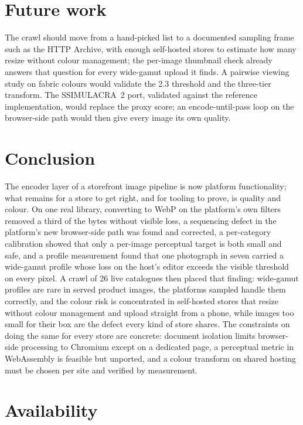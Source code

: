 \documentclass[sigconf,nonacm,screen]{acmart}
\begin{document}
\section{Future work}

The crawl should move from a hand-picked list to a documented sampling frame such as the HTTP Archive, with enough self-hosted stores to estimate how many resize without colour management; the per-image thumbnail check already answers that question for every wide-gamut upload it finds. A pairwise viewing study on fabric colours would validate the 2.3 threshold and the three-tier transform. The SSIMULACRA~2 port, validated against the reference implementation, would replace the proxy score; an encode-until-pass loop on the browser-side path would then give every image its own quality.

\section{Conclusion}

The encoder layer of a storefront image pipeline is now platform functionality; what remains for a store to get right, and for tooling to prove, is quality and colour. On one real library, converting to WebP on the platform's own filters removed a third of the bytes without visible loss, a sequencing defect in the platform's new browser-side path was found and corrected, a per-category calibration showed that only a per-image perceptual target is both small and safe, and a profile measurement found that one photograph in seven carried a wide-gamut profile whose loss on the host's editor exceeds the visible threshold on every pixel. A crawl of 26 live catalogues then placed that finding: wide-gamut profiles are rare in served product images, the platforms sampled handle them correctly, and the colour risk is concentrated in self-hosted stores that resize without colour management and upload straight from a phone, while images too small for their box are the defect every kind of store shares. The constraints on doing the same for every store are concrete: document isolation limits browser-side processing to Chromium except on a dedicated page, a perceptual metric in WebAssembly is feasible but unported, and a colour transform on shared hosting must be chosen per site and verified by measurement.

\section*{Availability}
\end{document}

